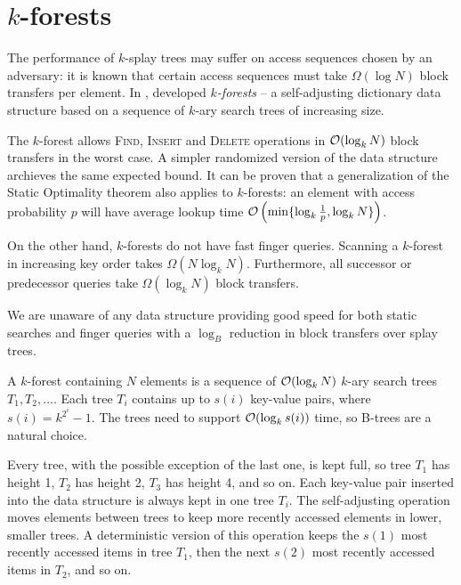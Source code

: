 \chapter{$k$-forests}
\label{chapter:kforest}
The performance of $k$-splay trees may suffer on access sequences chosen
by an adversary: it is known that certain access sequences must
take $\Omega(\log N)$ block transfers per element.
In \citeyear{martel}, \citeauthor{martel} developed \emph{$k$-forests} --
a self-adjusting dictionary data structure based on a sequence of
$k$-ary search trees of increasing size.

The $k$-forest allows \textsc{Find}, \textsc{Insert} and \textsc{Delete}
operations in $\mathcal{O}(\log_k N)$ block transfers in the worst case. A simpler
randomized version of the data structure archieves the same expected bound.
It can be proven that a generalization of the Static Optimality theorem
also applies to $k$-forests: an element with access probability $p$
will have average lookup time $\mathcal{O}\left(\min\{\log_k \frac{1}{p}, \log_k
N\}\right)$.


On the other hand, $k$-forests do not have fast finger queries. Scanning
a $k$-forest in increasing key order takes $\Omega(N\log_k N)$. Furthermore,
all successor or predecessor queries take $\Omega(\log_k N)$ block transfers.

We are unaware of any data structure providing good speed for both static
searches and finger queries with a $\log_B$ reduction in block transfers
over splay trees.

A $k$-forest containing $N$ elements is a sequence of $\mathcal{O}(\log_k N)$ $k$-ary
search trees $T_1, T_2, \ldots$. Each tree $T_i$ contains up to $s(i)$ key-value
pairs, where $s(i) = k^{2^i} - 1$. The trees need to support $\mathcal{O}(\log_k s(i))$
time, so B-trees are a natural choice.

Every tree, with the possible exception of the last one, is kept full,
so tree $T_1$ has height 1, $T_2$ has height 2, $T_3$ has height 4, and so on.
Each key-value pair inserted into the data structure is always kept in one
tree $T_i$. The self-adjusting operation moves elements between trees to
keep more recently accessed elements in lower, smaller trees.
A deterministic version of this operation keeps the $s(1)$ most recently
accessed items in tree $T_1$, then the next $s(2)$ most recently accessed
items in $T_2$, and so on.

